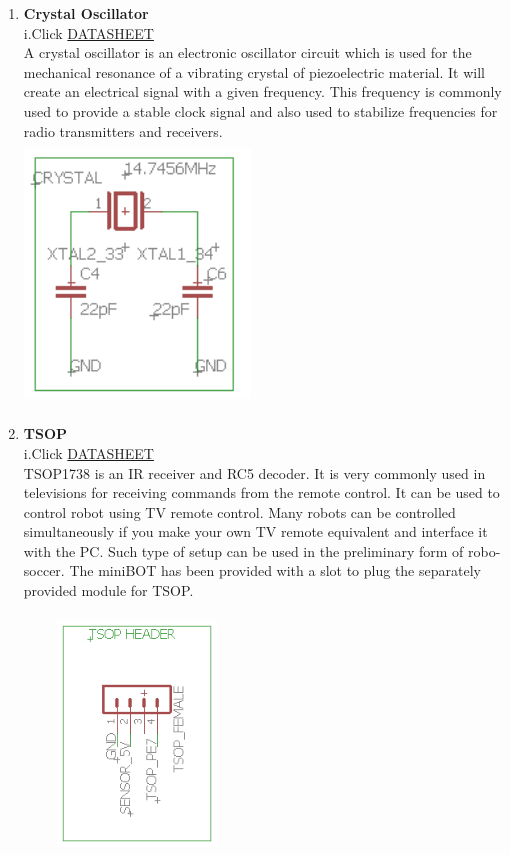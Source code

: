 \documentclass[a4paper,12pt,oneside]{book}
\begin{document}
\begin{enumerate}
    \newpage\item \textbf{Crystal Oscillator}\\
    i.Click \href{https://support.epson.biz/td/api/doc_check.php?dl=brief_SG-310SCF_en.pdf}{DATASHEET}
    \\[0.5cm]A crystal oscillator is an electronic oscillator circuit which is used for the mechanical resonance of a vibrating crystal of piezoelectric material. It will create an electrical signal with a given frequency. This frequency is commonly used to provide a stable clock signal and also used to stabilize frequencies for radio transmitters and receivers.
    \vspace*{2.5cm}
    \\\hspace*{3cm}\includegraphics[width=6cm, height=7cm]{Crystal}
    
     \newpage\item  \textbf{TSOP}\\
    i.Click \href{https://www.engineersgarage.com/sites/default/files/TSOP1738.pdf}{DATASHEET}
    \\[0.5cm]TSOP1738 is an IR receiver and RC5 decoder. It is very commonly used in televisions for receiving commands from the remote control. It can be used to control robot using TV remote control. Many robots can be controlled simultaneously if you make your own TV remote equivalent and interface it with the PC. Such type of setup can be used in the preliminary form of robo-soccer. 
    The miniBOT has been provided with a slot to plug the separately provided module for TSOP.\\
    \vspace*{1.5cm}
    \\\hspace*{3.5cm}\includegraphics[width=6cm, height=6cm]{TSOP}
    

\end{enumerate}
\end{document}
